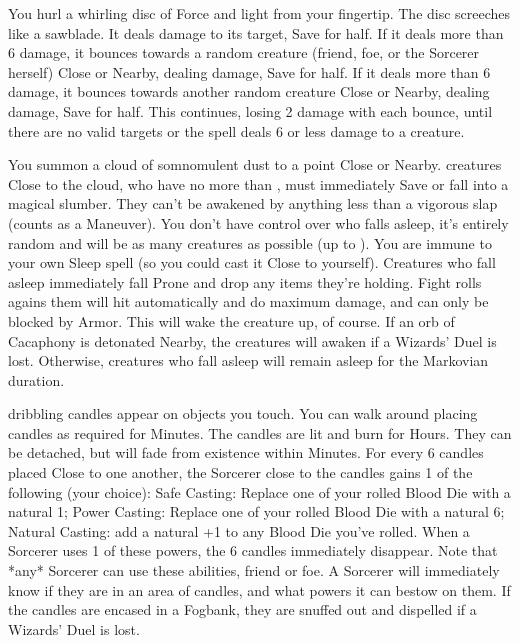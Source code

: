 {You hurl a whirling disc of Force and light from your fingertip. The disc
screeches like a sawblade. It deals \SUMDICE damage to its target, Save for
half. If it deals more than 6 damage, it bounces towards a random creature
(friend, foe, or the Sorcerer herself) Close or Nearby, dealing 
damage, Save for half. If it deals more than 6 damage, it bounces towards
another random creature Close or Nearby, dealing  damage, Save for
half. This continues, losing 2 damage with each bounce, until there are no
valid targets or the spell deals 6 or less damage to a creature.





\SPELL[
  Name=Sleep,
  Link=wizardry-sleep,
  Paradigm=Mind,
  Save=Y (negate),
  Duration=Markovian,
  Counter=\mylink{Cacaphony}{wizardry-cacaphony} ,
  Keywords=None,
  Target=Close or Nearby Area
]



You summon a cloud of somnomulent dust to a point Close or Nearby. 
\SUMDICE creatures Close to the cloud, who have no more than \DICE \HD, must
immediately Save or fall into a magical slumber.   They can't be awakened by
anything less than a vigorous slap (counts as a Maneuver).  You don't have
control over who falls asleep, it's entirely random and will be as many
creatures as possible (up to \SUMDICE).  You are immune to your own Sleep
spell (so you could cast it Close to yourself).  Creatures who fall asleep
immediately fall Prone and drop any items they're holding.  Fight rolls
agains them will hit automatically and do maximum damage, and can only be
blocked by Armor.  This will wake the creature up, of course.  If an orb of
Cacaphony is detonated Nearby, the creatures will awaken if a Wizards' Duel
is lost.  Otherwise, creatures who fall asleep will remain asleep for the
Markovian duration.   




\SPELL[
  Name=Summon Candles,
  Link=wizardry-summon-candles,
  Paradigm=Force,
  Save=N,
  Duration=Varies,
  Counter=\mylink{Fogbank}{wizardry-fogbank} ,
  Keywords=None,
  Target=Close
]



\SUMDICE dribbling candles appear on objects you touch. You can walk around
placing candles as required for Minutes. The candles are lit and burn for
Hours. They can be detached, but will fade from existence within Minutes. 
For every 6 candles placed Close to one another, the Sorcerer close to the
candles gains 1 of the following (your choice): Safe Casting: Replace one of
your rolled Blood Die with a natural 1; Power Casting: Replace one of your
rolled Blood Die with a natural 6; Natural Casting: add a natural +1 to any
Blood Die you've rolled.  When a Sorcerer uses 1 of these powers, the 6
candles immediately disappear.  Note that *any* Sorcerer can use these
abilities, friend or foe.  A Sorcerer will immediately know if they are in
an area of candles, and what powers it can bestow on them.  If the candles
are encased in a Fogbank, they are snuffed out and dispelled if a Wizards'
Duel is lost.





}
